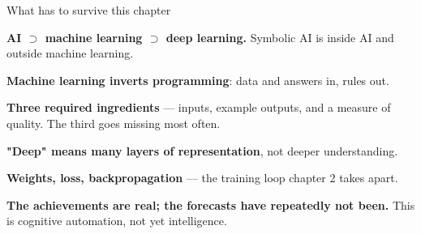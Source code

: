 \documentclass[aspectratio=169,11pt,t]{beamer}
\begin{document}
\begin{frame}[shrink=25]{What has to survive this chapter}
\begin{isteps}
\item \textbf{AI $\supset$ machine learning $\supset$ deep learning.} Symbolic AI is inside AI and outside machine learning.
\item \textbf{Machine learning inverts programming}: data and answers in, rules out.
\item \textbf{Three required ingredients} --- inputs, example outputs, and a measure of quality. The third goes missing most often.
\item \textbf{"Deep" means many layers of representation}, not deeper understanding.
\item \textbf{Weights, loss, backpropagation} --- the training loop chapter 2 takes apart.
\item \textbf{The achievements are real; the forecasts have repeatedly not been.} This is cognitive automation, not yet intelligence.
\end{isteps}
\vskip 4pt
\vskip 2pt
\end{frame}
\end{document}
